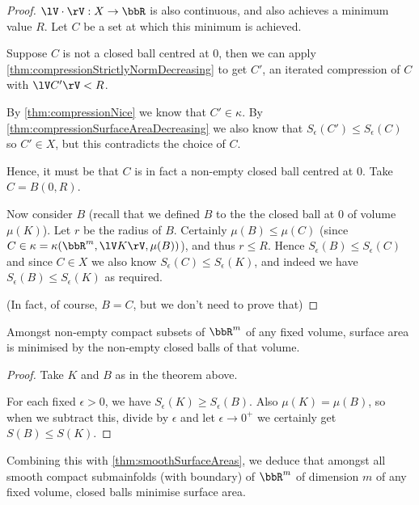 \documentclass[a4paper,11pt]{article}
\begin{document}
\begin{proof}
$\lV\cdot\rV:X\to\bbR$ is also continuous, and also achieves a minimum value
$R$.  Let $C$ be a set at which this minimum is achieved.

Suppose $C$ is not a closed ball centred at $0$, then we can apply
\ref{thm:compressionStrictlyNormDecreasing} to get $C'$, an iterated
compression of $C$ with $\lV C'\rV<R$.

By \ref{thm:compressionNice} we know that $C'\in\kappa$.
By \ref{thm:compressionSurfaceAreaDecreasing} we also know that
$S_\epsilon(C')\leq S_\epsilon(C)$ so $C'\in X$, but this contradicts the
choice of $C$.

Hence, it must be that $C$ is in fact a non-empty closed ball centred at $0$.
Take $C=B(0,R)$.

Now consider $B$ (recall that we defined $B$ to the the closed ball at $0$ of
volume $\mu(K)$).  Let $r$ be the radius of $B$.  Certainly $\mu(B)\leq\mu(C)$
(since $C\in\kappa=\kappa(\bbR^m,\lV K\rV,\mu(B))$), and thus
$r\leq R$.  Hence $S_\epsilon(B)\leq S_\epsilon(C)$ and since $C\in X$ we also
know $S_\epsilon(C)\leq S_\epsilon(K)$, and indeed we have
$S_\epsilon(B)\leq S_\epsilon(K)$ as required.

(In fact, of course, $B=C$, but we don't need to prove that)
\end{proof}

\begin{corollary}
Amongst non-empty compact subsets of $\bbR^m$ of any fixed volume, surface area
is minimised by the non-empty closed balls of that volume.
\end{corollary}

\begin{proof}
Take $K$ and $B$ as in the theorem above.

For each fixed $\epsilon>0$, we have $S_\epsilon(K)\geq S_\epsilon(B)$.  Also
$\mu(K)=\mu(B)$, so when we subtract this, divide by $\epsilon$
and let $\epsilon\to0^+$ we certainly
get $S(B)\leq S(K)$.
\end{proof}

\begin{corollary}
Combining this with \ref{thm:smoothSurfaceAreas}, we deduce that amongst all
smooth compact submainfolds (with boundary) of $\bbR^m$ of dimension $m$ of any
fixed volume, closed balls minimise surface area.
\end{corollary}

\end{document}
